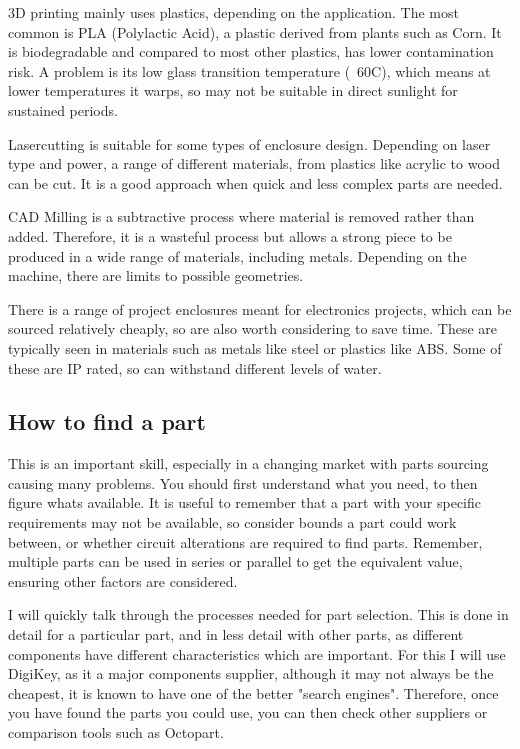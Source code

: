 \documentclass[a4paper,11pt]{report}
\begin{document}
3D printing mainly uses plastics, depending on the application. The most common is PLA (Polylactic Acid), a plastic derived from plants such as Corn. It is biodegradable and compared to most other plastics, has lower contamination risk. A problem is its low glass transition temperature (~60\degree C), which means at lower temperatures it warps, so may not be suitable in direct sunlight for sustained periods.

Lasercutting is suitable for some types of enclosure design. Depending on laser type and power, a range of different materials, from plastics like acrylic to wood can be cut. It is a good approach when quick and less complex parts are needed.

CAD Milling is a subtractive process where material is removed rather than added. Therefore, it is a wasteful process but allows a strong piece to be produced in a wide range of materials, including metals. Depending on the machine, there are limits to possible geometries.

There is a range of project enclosures meant for electronics projects, which can be sourced relatively cheaply, so are also worth considering to save time. These are typically seen in materials such as metals like steel or plastics like ABS. Some of these are IP rated, so can withstand different levels of water.

\subsection{How to find a part}

This is an important skill, especially in a changing market with parts sourcing causing many problems. You should first understand what you need, to then figure whats available. It is useful to remember that a part with your specific requirements may not be available, so consider bounds a part could work between, or whether circuit alterations are required to find parts. Remember, multiple parts can be used in series or parallel to get the equivalent value, ensuring other factors are considered.

I will quickly talk through the processes needed for part selection. This is done in detail for a particular part, and in less detail with other parts, as different components have different characteristics which are important. For this I will use DigiKey, as it a major components supplier, although it may not always be the cheapest, it is known to have one of the better "search engines". Therefore, once you have found the parts you could use, you can then check other suppliers or comparison tools such as Octopart.
\end{document}
